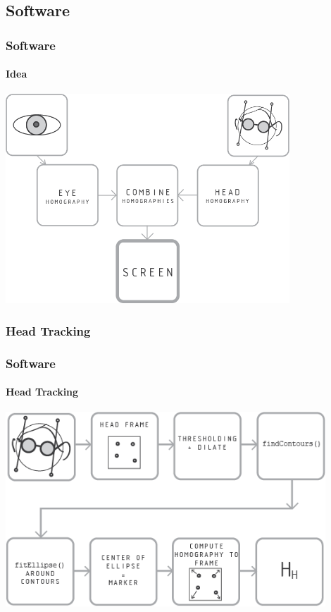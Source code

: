 \documentclass[%
14pt
]{beamer}
\begin{document}
\subsection{Software}
\begin{frame}
	\frametitle{Software}
  \framesubtitle{Idea}
  \vspace*{-0.5cm}
  \begin{center}
    \includegraphics[width=0.8\textwidth]{01.png}
  \end{center}

\end{frame}
\subsubsection{Head Tracking}
\begin{frame}
	\frametitle{Software}
  \framesubtitle{Head Tracking}
  \vspace*{-0.5cm}
  \begin{center}
    \includegraphics[width=0.9\textwidth]{03.png}
  \end{center}
\end{frame}
\end{document}
